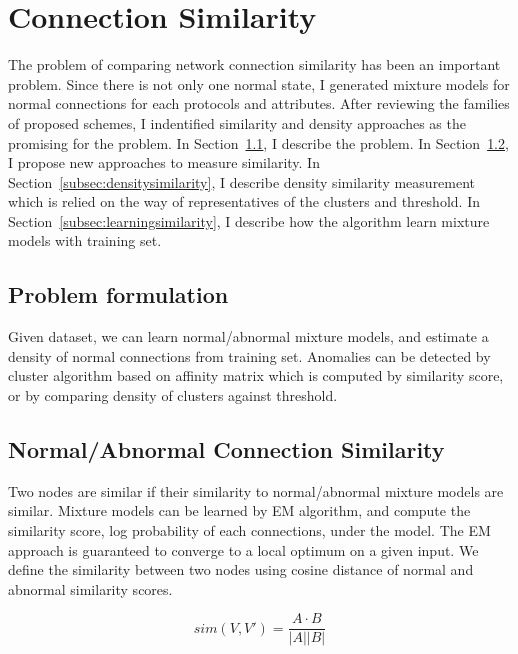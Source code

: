 \section{Connection Similarity}
\label{sec:connectionsimilarity}
The problem of comparing network connection similarity has been an important problem. %
Since there is not only one normal state, I generated mixture models for normal connections for each protocols and attributes.
After reviewing the families of proposed schemes, I indentified similarity and density approaches as the promising for the problem.
\newline
In Section~\ref{subsec:problemformulation}, I describe the problem.\newline
In Section~\ref{subsec:normalabnormalsimilarity}, I propose new approaches to measure similarity.\newline
In Section~\ref{subsec:densitysimilarity}, I describe density similarity measurement which is relied on the way of representatives of the clusters and threshold.\newline
In Section~\ref{subsec:learningsimilarity}, I describe how the algorithm learn mixture models with training set.\newline

\subsection{Problem formulation}
\label{subsec:problemformulation}
Given dataset, we can learn normal/abnormal mixture models, and estimate a density of normal connections from training set.
Anomalies can be detected by cluster algorithm based on affinity matrix which is computed by similarity score, or by comparing density of clusters against threshold.

\subsection{Normal/Abnormal Connection Similarity}
\label{subsec:normalabnormalsimilarity}
Two nodes are similar if their similarity to normal/abnormal mixture models are similar.
Mixture models can be learned by EM algorithm, and compute the similarity score, log probability of each connections, under the model.
The EM approach is guaranteed to converge to a local optimum on a given input.
We define the similarity between two nodes using cosine distance of normal and abnormal similarity scores.

\begin{equation}
    sim(V, V') = \frac{A \cdot B}{|A| |B|}
\end{equation}


